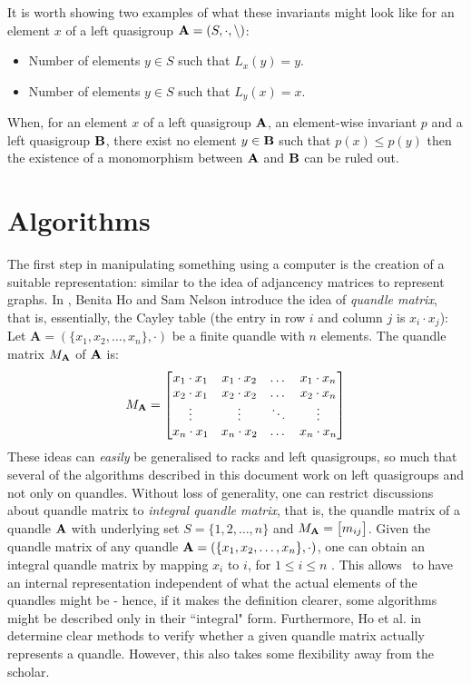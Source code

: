 \documentclass{mcom-l}
\begin{document}
It is worth showing two examples of what these invariants might look like for an element $x$ of a left quasigroup $\mathbf{A} = (S, \cdot, \backslash)$:
\begin{itemize}
    \item Number of elements $y \in S$ such that $L_x(y) = y$.
    \item Number of elements $y \in S$ such that $L_y(x) = x$.
\end{itemize}
When, for an element $x$ of a left quasigroup $\mathbf{A}$, an element-wise invariant $p$ and a left quasigroup $\mathbf{B}$, there exist no element $y\in\mathbf{B}$ such that $p(x)\leq p(y)$ then the existence of a monomorphism between $\mathbf{A}$ and $\mathbf{B}$ can be ruled out.




\section{Algorithms}
\noindent The first step in manipulating something using a computer is the creation of a suitable representation: similar to the idea of adjancency matrices to represent graphs. In \cite{ho2005matrices}, Benita Ho and Sam Nelson introduce the idea of \emph{quandle matrix}, that is, essentially, the Cayley table (the entry in row $i$ and column $j$ is $x_i \cdot x_j$):
Let $\mathbf{A}=(\{x_1, x_2, \dots, x_n\}, \cdot)$ be a finite quandle with $n$ elements. \newline 
    The quandle matrix $M_\mathbf{A}$ of $\mathbf{A}$ is:
    \[M_\mathbf{A} = \begin{bmatrix}
 x_1 \cdot x_1 & x_1 \cdot x_2 & \dots & x_1 \cdot x_n \\
 x_2 \cdot x_1 & x_2 \cdot x_2 & \dots & x_2 \cdot x_n\\
 \vdots & \vdots & \ddots & \vdots \\
 x_n \cdot x_1 & x_n \cdot x_2 & \dots & x_n \cdot x_n
\end{bmatrix}\]
These ideas can \emph{easily} be generalised to racks and left quasigroups, so much that several of the algorithms described in this document work on left quasigroups and not only on quandles.\newline
Without loss of generality, one can restrict discussions about quandle matrix to \emph{integral quandle matrix}, that is, the quandle matrix of a quandle $\mathbf{A}$ with underlying set $S =\{1,2,\dots,n\}$ and $M_\mathbf{A} = \begin{bmatrix} m_{ij}\end{bmatrix}$. Given the quandle matrix of any quandle $\mathbf{A}=(\{x_1, x_2, \dots, x_n\}, \cdot)$, one can obtain an integral quandle matrix by mapping $x_i$ to $i$, for $1 \leq i \leq n$ \cite{ho2005matrices}. This allows \Software~to have an internal representation independent of what the actual elements of the quandles might be - hence, if it makes the definition clearer, some algorithms might be described only in their ``integral" form. Furthermore, Ho et al. in \cite{ho2005matrices} determine clear methods to verify whether a given quandle matrix actually represents a quandle. However, this also takes some flexibility away from the scholar.\newline
\end{document}
